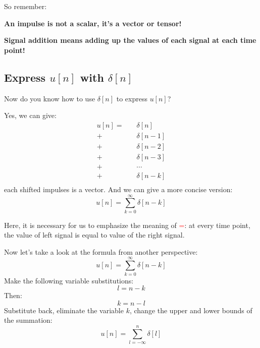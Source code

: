         So remember: 
        
        \textbf{An impulse is not a scalar, it's a vector or tensor!}
        
        \textbf{Signal addition means adding up the values of each signal at each time point!}
        
        \subsection{Express $u[n]$ with $\delta[n]$}
        Now do you know how to use $\delta[n]$ to express $u[n]$? 
        
        Yes, we can give:
                        \begin{equation}
                            \begin{aligned}
                                u[n] = \quad & \delta[n] \\
                                    +  & \delta[n-1] \\
                                    +  & \delta[n-2] \\
                                    +  & \delta[n-3] \\
                                    +  & \cdots \\
                                    +  & \delta[n-k] \\
                            \end{aligned}
                        \end{equation}
        each shifted impulses is a vector.
        And we can give a more concise version:
                        \begin{equation}
                            u[n] = \sum_{k=0}^{\infty} \delta[n-k]
                        \end{equation}
        
        Here, it is necessary for us to emphasize the meaning of \textcolor{red}{=}: at every time point, the value of left signal is equal to value of the right signal.

        Now let's take a look at the formula from another perspective:
                        \begin{equation}
                            u[n] = \sum_{k=0}^{\infty} \delta[n-k]
                        \end{equation}
        Make the following variable substitutions:
                        \begin{equation}
                            l = n -k 
                        \end{equation}
        Then:
                        \begin{equation}
                            k = n -l 
                        \end{equation}
        Substitute back, eliminate the variable $k$, change the upper and lower bounds of the summation:
                        \begin{equation}
                            u[n] = \sum_{l=-\infty}^{n} \delta[l]
                        \end{equation}

